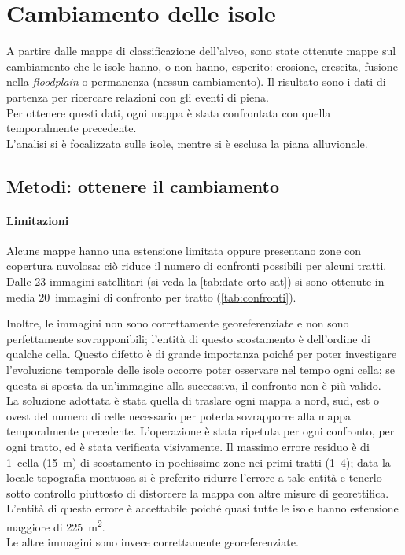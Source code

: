 \section{Cambiamento delle isole}
A partire dalle mappe di classificazione dell'alveo, sono state ottenute mappe sul cambiamento che le isole hanno, o non hanno, esperito: erosione, crescita, fusione nella \emph{floodplain} o permanenza (nessun cambiamento).
Il risultato sono i dati di partenza per ricercare relazioni con gli eventi di piena.
\\
Per ottenere questi dati, ogni mappa è stata confrontata con quella temporalmente precedente.
\\
L'analisi si è focalizzata sulle isole, mentre si è esclusa la piana alluvionale.

\subsection{Metodi: ottenere il cambiamento}
\paragraph{Limitazioni} \label{par:camb-limiti}
Alcune mappe hanno una estensione limitata oppure presentano zone con copertura nuvolosa: ciò riduce il numero di confronti possibili per alcuni tratti. 
Dalle 23 immagini satellitari (si veda la \cref{tab:date-orto-sat}) si sono ottenute in media 20~immagini di confronto per tratto (\cref{tab:confronti}).

Inoltre, le immagini \AST{} non sono correttamente georeferenziate e non sono perfettamente sovrapponibili; l'entità di questo scostamento è dell'ordine di qualche cella.
Questo difetto è di grande importanza poiché per poter investigare l'evoluzione temporale delle isole occorre poter osservare nel tempo ogni cella; se questa si sposta da un'immagine alla successiva, il confronto non è più valido.
\\
La soluzione adottata è stata quella di traslare ogni mappa a nord, sud, est o ovest del numero di celle necessario per poterla sovrapporre alla mappa temporalmente precedente.
L'operazione è stata ripetuta per ogni confronto, per ogni tratto, ed è stata verificata visivamente.
Il massimo errore residuo è di 1~cella (\SI{15}{\m}) di scostamento in pochissime zone nei primi tratti (\numrange[range-phrase={ - }]{1}{4}); data la locale topografia montuosa si è preferito ridurre l'errore a tale entità e tenerlo sotto controllo piuttosto di distorcere la mappa con altre misure di georettifica.
L'entità di questo errore è accettabile poiché quasi tutte le isole hanno estensione maggiore di \SI{225}{\m\tothe{2}}.
\\
Le altre immagini sono invece correttamente georeferenziate.

